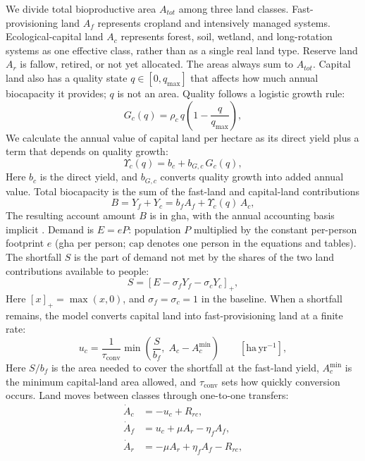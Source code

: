 \documentclass[preprint,12pt,authoryear]{elsarticle}
\newcommand{\pos}[1]{\left[#1\right]_+}
\newcommand{\Ups}{\Upsilon_c}
\newcommand{\Acmin}{A_c^{\min}}
\newcommand{\tconv}{\tau_{\mathrm{conv}}}
\begin{document}
We divide total bioproductive area $A_{tot}$ among three land classes. Fast-provisioning land $A_f$ represents cropland and intensively managed systems. Ecological-capital land $A_c$ represents forest, soil, wetland, and long-rotation systems as one effective class, rather than as a single real land type. Reserve land $A_r$ is fallow, retired, or not yet allocated. The areas always sum to $A_{tot}$. Capital land also has a quality state $q\in[0,q_{\max}]$ that affects how much annual biocapacity it provides; $q$ is not an area. Quality follows a logistic growth rule:
\begin{equation}\label{eq:Gc}
G_c(q)=\rho_c\,q\left(1-\frac{q}{q_{\max}}\right),
\end{equation}
We calculate the annual value of capital land per hectare as its direct yield plus a term that depends on quality growth:
\begin{equation}\label{eq:Ups}
\Ups(q)=b_c+b_{G,c}\,G_c(q),
\end{equation}
Here $b_c$ is the direct yield, and $b_{G,c}$ converts quality growth into added annual value. Total biocapacity is the sum of the fast-land and capital-land contributions
\begin{equation}\label{eq:B}
B=Y_f+Y_c=b_f A_f+\Ups(q)\,A_c ,
\end{equation}
The resulting account amount $B$ is in gha, with the annual accounting basis implicit \citep{GFNStandards2009,GFNGuidebook2019}. Demand is $E=eP$: population $P$ multiplied by the constant per-person footprint $e$ (gha per person; $\mathrm{cap}$ denotes one person in the equations and tables). The shortfall $S$ is the part of demand not met by the shares of the two land contributions available to people:
\begin{equation}\label{eq:S}
S=\pos{E-\sigma_f Y_f-\sigma_c Y_c},
\end{equation}
Here $\pos{x}=\max(x,0)$, and $\sigma_f=\sigma_c=1$ in the baseline. When a shortfall remains, the model converts capital land into fast-provisioning land at a finite rate:
\begin{equation}\label{eq:uc}
u_c=\frac{1}{\tconv}\min\!\left(\frac{S}{b_f},\;A_c-\Acmin\right)\qquad[\mathrm{ha\,yr^{-1}}],
\end{equation}
Here $S/b_f$ is the area needed to cover the shortfall at the fast-land yield, $\Acmin$ is the minimum capital-land area allowed, and $\tconv$ sets how quickly conversion occurs. Land moves between classes through one-to-one transfers:
\begin{align}
\dot A_c&=-u_c+R_{rc},\label{eq:Ac}\\
\dot A_f&=u_c+\mu A_r-\eta_f A_f,\label{eq:Af}\\
\dot A_r&=-\mu A_r+\eta_f A_f-R_{rc},\label{eq:Ar}
\end{align}
\end{document}
